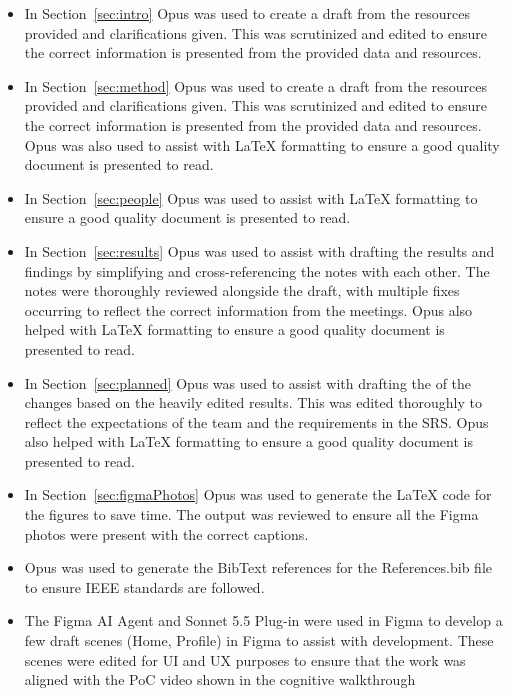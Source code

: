 \documentclass{article}
\begin{document}
\begin{itemize}
    \item In Section~\ref{sec:intro} Opus was used to create a draft from 
    the resources provided and clarifications given. This was scrutinized 
    and edited to ensure the correct information is presented from the provided
    data and resources.
    \item In Section~\ref{sec:method} Opus was used to create a draft from 
    the resources provided and clarifications given. This was scrutinized 
    and edited to ensure the correct information is presented from the provided
    data and resources. Opus was also used to assist with \LaTeX{} formatting 
    to ensure a good quality document is presented to read.
    \item In Section~\ref{sec:people} Opus was used to assist with \LaTeX{} formatting 
    to ensure a good quality document is presented to read.
    \item In Section~\ref{sec:results} Opus was used to assist with drafting the 
    results and findings by simplifying and cross-referencing the notes with each other.
    The notes were thoroughly reviewed alongside the draft, with multiple fixes occurring 
    to reflect the correct information from the meetings. Opus also helped with 
    \LaTeX{} formatting to ensure a good quality document is presented to read.
    \item In Section~\ref{sec:planned} Opus was used to assist with drafting the 
    of the changes based on the heavily edited results. This was edited thoroughly to 
    reflect the expectations of the team and the requirements in the SRS. Opus also helped with 
    \LaTeX{} formatting to ensure a good quality document is presented to read.
    \item In Section~\ref{sec:figmaPhotos} Opus was used to generate the \LaTeX{} code for the 
    figures to save time. The output was reviewed to ensure all the Figma photos were present 
    with the correct captions.
    \item Opus was used to generate the BibText references for the References.bib file to
    ensure IEEE standards are followed.
    \item The Figma AI Agent and Sonnet 5.5 Plug-in were used in Figma to develop a few draft 
    scenes (Home, Profile) in Figma to assist with development. These scenes were edited for UI 
    and UX purposes to ensure that the work was aligned with the PoC video shown in the cognitive 
    walkthrough

\end{itemize}
\end{document}
